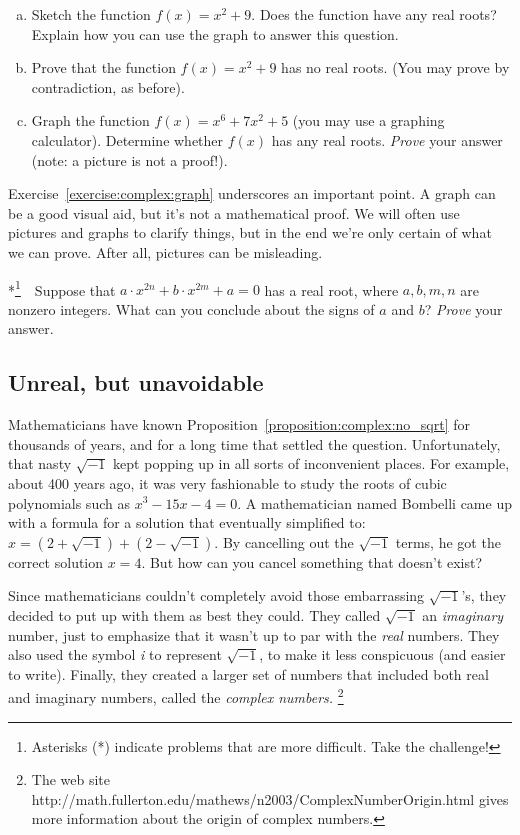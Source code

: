 \begin{exercise}\label{exercise:complex:graph}
\begin{enumerate}[(a)]
\item
Sketch the function  $f(x) = x^2 + 9$. Does the function have any real roots? Explain how you can use the graph to answer this question.
\item 
Prove that the function $f(x) = x^2 + 9$ has no real roots.  (You may prove by contradiction, as before). 
\item
Graph the function $f(x) = x^6 + 7x^2 + 5$ (you may use a graphing calculator). Determine whether $f(x)$ has any real roots. \emph{Prove} your answer (note: a picture is not a proof!).
\end{enumerate}
\end{exercise}
\noindent
Exercise~\ref{exercise:complex:graph} underscores an important point. A graph can be a good visual aid, but it's not a mathematical proof.  We will often use pictures and graphs to clarify things, but in the end we're only certain of what we can prove. After all, pictures can be misleading.

\begin{exercise}\label{exercise:complex:more}
*\footnote{Asterisks (*) indicate problems that are more difficult. Take the challenge!}~~Suppose that $a \cdot x^{2n} + b \cdot x^{2m} +a = 0$ has a real root, where $a,b,m,n$ are nonzero integers. What can you conclude about the signs of $a$ and $b$? \emph{Prove} your answer.
\end{exercise}

\subsection{Unreal, but unavoidable}

Mathematicians have known Proposition~\ref{proposition:complex:no_sqrt} for thousands of years, and
for a long time that settled the question. Unfortunately, that nasty
$\sqrt{-1}$ kept popping up in all sorts of inconvenient places.
For example, about 400 years ago, it was very fashionable to study
the roots of cubic polynomials such as $x^{3}-15x-4=0$. A mathematician
named Bombelli came up with a formula for a solution that eventually
simplified to: $x = (2 + \sqrt{-1}) + (2 - \sqrt{-1})$. By cancelling
out the $\sqrt{-1}$ terms, he got the correct solution $x=4$.
But how can you cancel something that doesn't exist?

Since mathematicians couldn't completely avoid those embarrassing 
$\sqrt{-1}$'s, they decided to put up with them as best they could. They
called $\sqrt{-1}$ an \emph{imaginary }number, just to emphasize
that it wasn't up to par with the \emph{real} numbers. They also used the symbol \emph{i }to represent $\sqrt{-1}$, to make it less
conspicuous (and easier to write). Finally, they created a larger
set of numbers that included both real and imaginary numbers, called
the \emph{complex numbers.}
\footnote{The web site http://math.fullerton.edu/mathews/n2003/ComplexNumberOrigin.html
gives more information about the origin of complex numbers.}

